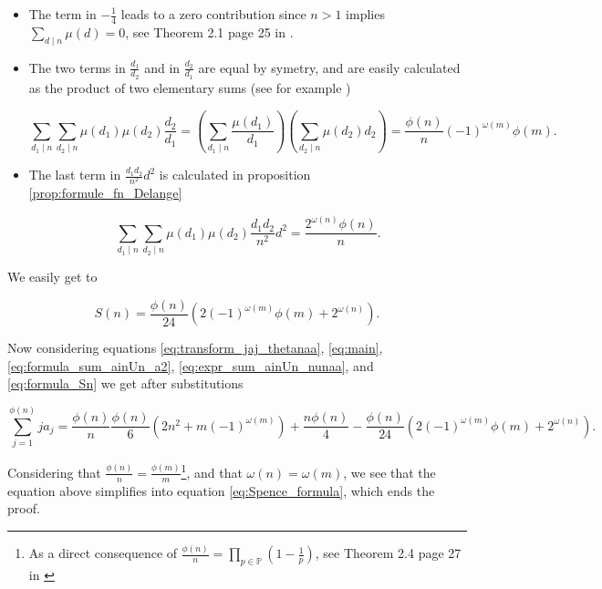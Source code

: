 \documentclass[a4paper,12pt]{article}
\begin{document}
\begin{itemize}
	\item The term in $-\frac{1}{4}$ leads to a zero contribution since $n>1$ implies $\sum_{d \mid n}\mu(d)=0$, see Theorem 2.1 page 25 in \cite{apostol1976introduction}.
	\item The two terms in $\frac{d_1}{d_2}$ and in $\frac{d_2}{d_1}$ are equal by symetry, and are easily calculated as the product of two elementary sums (see for example \cite{apostol1976introduction})
	
\begin{equation*}
\sum_{d_1 \mid n} \sum_{d_2 \mid n} \mu(d_1) \mu(d_2) \frac{d_2}{d_1} = \left( \sum_{d_1 \mid n} \frac{\mu(d_1)}{d_1} \right)\left( \sum_{d_2 \mid n} \mu(d_2)d_2 \right) = \frac{\phi(n)}{n}(-1)^{\omega(m)}\phi(m).
\end{equation*}
	
	\item The last term in $\frac{d_1d_2}{n^2}d^2$ is calculated in proposition \ref{prop:formule_fn_Delange}
	
\begin{equation*}
\sum_{d_1 \mid n} \sum_{d_2 \mid n} \mu(d_1) \mu(d_2) \frac{d_1d_2}{n^2}d^2 = \frac{2^{\omega(n)}\phi(n)}{n}.
\end{equation*}
\end{itemize}

We easily get to

\begin{equation}\label{eq:formula_Sn}
S(n) = \frac{\phi(n)}{24}\left(2(-1)^{\omega(m)}\phi(m)+2^{\omega(n)}\right).
\end{equation}

Now considering equations \ref{eq:transform_jaj_thetanaa}, \ref{eq:main}, \ref{eq:formula_sum_ainUn_a2}, \ref{eq:expr_sum_ainUn_nunaa}, and \ref{eq:formula_Sn} we get after substitutions

\begin{equation*}
\sum_{j=1}^{\phi(n)}ja_j = \frac{\phi(n)}{n}\frac{\phi(n)}{6}\left( 2 n^2 + m (-1)^{\omega(m)} \right) + \frac{n\phi(n)}{4} - \frac{\phi(n)}{24}\left(2(-1)^{\omega(m)}\phi(m)+2^{\omega(n)}\right).
\end{equation*}

Considering that $\frac{\phi(n)}{n}=\frac{\phi(m)}{m}$\footnote{As a direct consequence of $\frac{\phi(n)}{n}=\prod_{p\in \mathbb{P}}\left(1-\frac{1}{p}\right)$, see Theorem 2.4 page 27 in \cite{apostol1976introduction}}, and that $\omega(n)=\omega(m)$, we see that the equation above simplifies into equation \ref{eq:Spence_formula}, which ends the proof.
\end{document}
